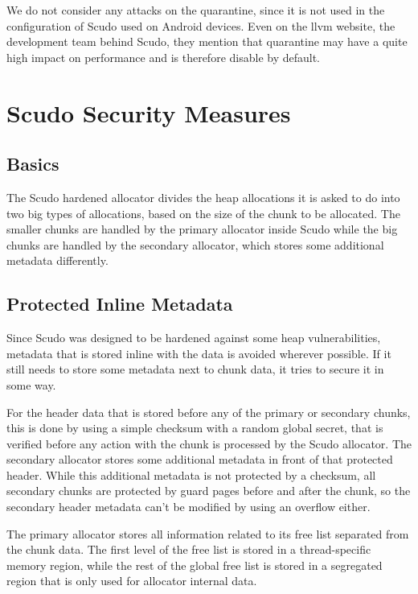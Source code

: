 \documentclass[a4paper,11pt,oneside]{report}
\begin{document}
We do not consider any attacks on the quarantine, since it is not used in the
configuration of Scudo used on Android devices. Even on the llvm website, the development
team behind Scudo, they mention that quarantine may have a quite high impact on
performance and is therefore disable by default.

\chapter{Scudo Security Measures}

\section{Basics}

The Scudo hardened allocator divides the heap allocations it is asked to do into two big
types of allocations, based on the size of the chunk to be allocated.  The smaller chunks
are handled by the primary allocator inside Scudo while the big chunks are handled by the
secondary allocator, which stores some additional metadata differently.

\section{Protected Inline Metadata}

Since Scudo was designed to be hardened against some heap vulnerabilities, metadata that
is stored inline with the data is avoided wherever possible. If it still needs to store
some metadata next to chunk data, it tries to secure it in some way.

For the header data that is stored before any of the primary or secondary chunks, this is
done by using a simple checksum with a random global secret, that is verified before any
action with the chunk is processed by the Scudo allocator. The secondary allocator stores
some additional metadata in front of that protected header. While this additional metadata
is not protected by a checksum, all secondary chunks are protected by guard pages before
and after the chunk, so the secondary header metadata can't be modified by using an
overflow either.

The primary allocator stores all information related to its free list separated from the
chunk data. The first level of the free list is stored in a thread-specific memory
region, while the rest of the global free list is stored in a segregated region that is
only used for allocator internal data.
\end{document}
